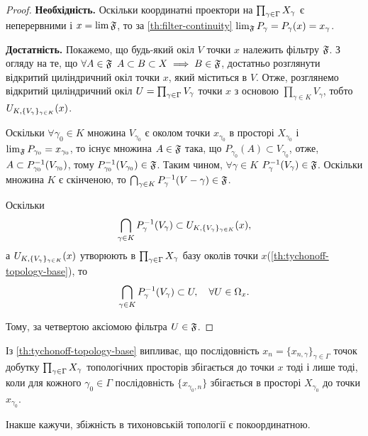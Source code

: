 \begin{proof}
    \textbf{Необхідність.} Оскільки координатні проектори на $\CartesianProduct{X}$ є неперервними і $x = \lim \frak F$, то за \cref{th:filter-continuity} $\lim_{\frak F} P_\gamma = P_\gamma(x) = x_\gamma$.

    \textbf{Достатність.} Покажемо, що будь-який окіл $V$ точки $x$ належить фільтру $\frak F$. З огляду на те, що $\forall A \in \frak F$ $A \subset B \subset X \implies B \in \frak F$, достатньо розглянути відкритий циліндричний окіл точки $x$, який міститься в $V$. Отже, розглянемо відкритий циліндричний окіл $U = \CartesianProduct{V}$ точки $x$ з основою $\prod_{\gamma \in K} V_\gamma$, тобто $\CartesianNeighbourhood{x}$.
    
    Оскільки $\forall \gamma_0 \in K$ множина $V_{\gamma_0}$ є околом точки $x_{\gamma_0}$ в просторі $X_{\gamma_0}$ і $\lim_{\frak F} P_{\gamma_0} = x_{\gamma_0}$, то існує множина $A \in \frak F$ така, що $P_{\gamma_0}(A) \subset V_{\gamma_0}$, отже, $A \subset P_{\gamma_0}\inv(V_{\gamma_0})$, тому $P_{\gamma_0}\inv(V_{\gamma_0}) \in \frak F$. Таким чином, $\forall \gamma \in K$ $P_\gamma\inv(V_\gamma) \in \frak F$. Оскільки множина $K$ є скінченою, то $\bigcap_{\gamma \in K} P_\gamma\inv(V-\gamma) \in \frak F$.
    
    Оскільки
    \begin{equation*}
        \bigcap_{\gamma \in K} P_\gamma\inv(V_\gamma) \subset \CartesianNeighbourhood{x},
    \end{equation*}
    а $\CartesianNeighbourhood{x}$ утворюють в $\CartesianProduct{X}$ базу околів точки $x$(\cref{th:tychonoff-topology-base}), то
    \begin{equation*}
        \bigcap_{\gamma \in K} P_\gamma\inv(V_\gamma) \subset U, \quad \forall U \in \Omega_x.
    \end{equation*}

    Тому, за четвертою аксіомою фільтра $U \in \frak F$.
\end{proof}

\begin{remark}
    Із \cref{th:tychonoff-topology-base} випливає, що послідовність $x_n = \{x_{n,\gamma}\}_{\gamma \in \Gamma}$ точок добутку $\CartesianProduct{X}$ топологічних просторів збігається до точки $x$ тоді і лише тоді, коли для кожного $\gamma_0 \in \Gamma$ послідовність $\{x_{\gamma_0, n}\}$ збігається в просторі $X_{\gamma_0}$ до точки $x_{\gamma_0}$. 
    
    Інакше кажучи, збіжність в тихоновській топології є покоординатною.
\end{remark}

